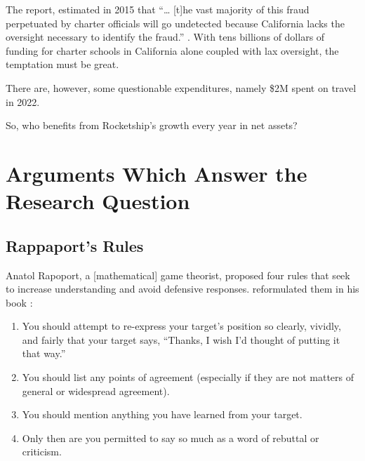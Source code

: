 The report,  estimated in 2015 that ``\ldots{} [t]he vast majority of this fraud perpetuated by charter officials will go undetected because California lacks the oversight necessary to identify the fraud.'' \parencite[2]{CPD2015}. With tens billions of dollars of funding for charter schools in California alone coupled with lax oversight, the temptation must be great. 

There are, however, some questionable expenditures, namely \$2M spent on travel in 2022.

So, who benefits from Rocketship's growth every year in net assets?

\section{Arguments Which Answer the Research Question}%
\label{sec:appr-answ-rese-quest}\indent%

\subsection{Rappaport's Rules}%
\label{sec:rappaports-rules}\indent%

Anatol Rapoport, a [mathematical] game theorist, proposed four rules that seek to increase understanding and avoid defensive responses.  reformulated them in his book  \parencite{Dennett2013}:
\begin{enumerate}[topsep=0.3\baselineskip,itemsep=0.25\baselineskip]
  \item You should attempt to re-express your target’s position so clearly, vividly, and fairly that your target says, “Thanks, I wish I’d thought of putting it that way.”
  \item You should list any points of agreement (especially if they are not matters of general or widespread agreement).
  \item You should mention anything you have learned from your target.
  \item Only then are you permitted to say so much as a word of rebuttal or criticism.
\end{enumerate}
\medskip

